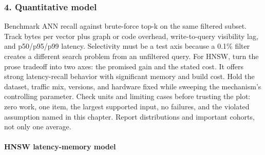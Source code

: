 \subsubsection*{4. Quantitative model}
Benchmark ANN recall against brute-force top-k on the same filtered subset. Track bytes per vector plus graph or code overhead, write-to-query visibility lag, and p50/p95/p99 latency. Selectivity must be a test axis because a 0.1\% filter creates a different search problem from an unfiltered query.
For HNSW, turn the prose tradeoff into two axes: the promised gain and the stated cost. It offers strong latency-recall behavior with significant memory and build cost. Hold the dataset, traffic mix, versions, and hardware fixed while sweeping the mechanism's controlling parameter.
Check units and limiting cases before trusting the plot: zero work, one item, the largest supported input, no failures, and the violated assumption named in this chapter. Report distributions and important cohorts, not only one average.
\paragraph{HNSW latency-memory model}
